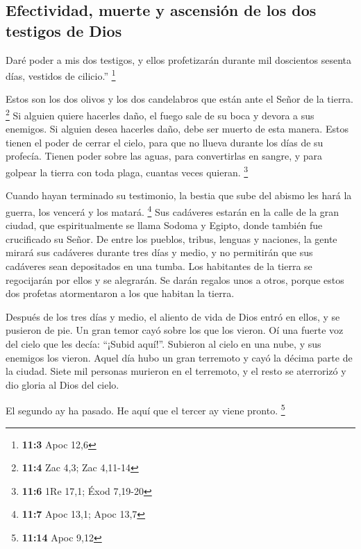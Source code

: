 \begin{paracol}{2}
\hypertarget{efectividad-muerte-y-ascensiuxf3n-de-los-dos-testigos-de-dios}{%
\subsection{Efectividad, muerte y ascensión de los dos testigos de
Dios}\label{efectividad-muerte-y-ascensiuxf3n-de-los-dos-testigos-de-dios}}

 Daré poder a mis dos testigos, y ellos profetizarán
durante mil doscientos sesenta días, vestidos de cilicio.'' \footnote{\textbf{11:3}
  Apoc 12,6}

 Estos son los dos olivos y los dos candelabros que están
ante el Señor de la tierra. \footnote{\textbf{11:4} Zac 4,3; Zac 4,11-14}
 Si alguien quiere hacerles daño, el fuego sale de su boca
y devora a sus enemigos. Si alguien desea hacerles daño, debe ser muerto
de esta manera.  Estos tienen el poder de cerrar el cielo,
para que no llueva durante los días de su profecía. Tienen poder sobre
las aguas, para convertirlas en sangre, y para golpear la tierra con
toda plaga, cuantas veces quieran. \footnote{\textbf{11:6} 1Re 17,1;
  Éxod 7,19-20}

 Cuando hayan terminado su testimonio, la bestia que sube
del abismo les hará la guerra, los vencerá y los matará. \footnote{\textbf{11:7}
  Apoc 13,1; Apoc 13,7}  Sus cadáveres estarán en la calle
de la gran ciudad, que espiritualmente se llama Sodoma y Egipto, donde
también fue crucificado su Señor.  De entre los pueblos,
tribus, lenguas y naciones, la gente mirará sus cadáveres durante tres
días y medio, y no permitirán que sus cadáveres sean depositados en una
tumba.  Los habitantes de la tierra se regocijarán por
ellos y se alegrarán. Se darán regalos unos a otros, porque estos dos
profetas atormentaron a los que habitan la tierra.

 Después de los tres días y medio, el aliento de vida de
Dios entró en ellos, y se pusieron de pie. Un gran temor cayó sobre los
que los vieron.  Oí una fuerte voz del cielo que les
decía: ``¡Subid aquí!''. Subieron al cielo en una nube, y sus enemigos
los vieron.  Aquel día hubo un gran terremoto y cayó la
décima parte de la ciudad. Siete mil personas murieron en el terremoto,
y el resto se aterrorizó y dio gloria al Dios del cielo.

 El segundo ay ha pasado. He aquí que el tercer ay viene
pronto. \footnote{\textbf{11:14} Apoc 9,12}


\end{paracol}
